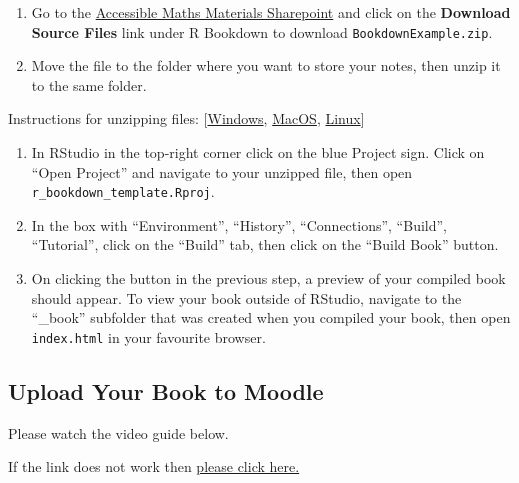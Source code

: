 \documentclass[
  letterpaper,
]{article}
\providecommand{\tightlist}{%
  \setlength{\itemsep}{0pt}\setlength{\parskip}{0pt}}\usepackage{longtable,booktabs,array}
\numberwithin{equation}{section}
\numberwithin{figure}{section}
\theoremstyle{break}
\begin{document}
\begin{enumerate}
\def\labelenumi{\arabic{enumi})}
\tightlist
\item
  Go to the
  \href{https://uniofnottm.sharepoint.com/sites/AccessibleMathsMaterials?target=_blank}{Accessible
  Maths Materials Sharepoint} and click on the \textbf{Download Source
  Files} link under R Bookdown to download \texttt{BookdownExample.zip}.
\item
  Move the file to the folder where you want to store your notes, then
  unzip it to the same folder.
\end{enumerate}

Instructions for unzipping files:
{[}\href{https://support.microsoft.com/en-us/windows/zip-and-unzip-files-f6dde0a7-0fec-8294-e1d3-703ed85e7ebc?target=_blank}{Windows},
\href{https://support.apple.com/en-gb/guide/mac-help/mchlp2528/mac\#:~:text=Unzip\%20(expand)\%20a\%20compressed\%20item,zip\%20file.?target=_blank}{MacOS},
\href{https://unstop.com/blog/how-to-unzip-a-file-in-linux?target=_blank}{Linux}{]}

\begin{enumerate}
\def\labelenumi{\arabic{enumi})}
\setcounter{enumi}{2}
\item
  In RStudio in the top-right corner click on the blue Project sign.
  Click on ``Open Project'' and navigate to your unzipped file, then
  open \texttt{r\_bookdown\_template.Rproj}.
\item
  In the box with ``Environment'', ``History'', ``Connections'',
  ``Build'', ``Tutorial'', click on the ``Build'' tab, then click on the
  ``Build Book'' button.
\item
  On clicking the button in the previous step, a preview of your
  compiled book should appear. To view your book outside of RStudio,
  navigate to the ``\_book'' subfolder that was created when you
  compiled your book, then open \texttt{index.html} in your favourite
  browser.
\end{enumerate}

\subsection{Upload Your Book to
Moodle}\label{upload-your-book-to-moodle}

Please watch the video guide below.

If the link does not work then
\href{https://mediaspace.nottingham.ac.uk/media/How+to+upload+R+bookdown+file+to+Moodle/1_la5eitil}{please
click here.}
\end{document}
